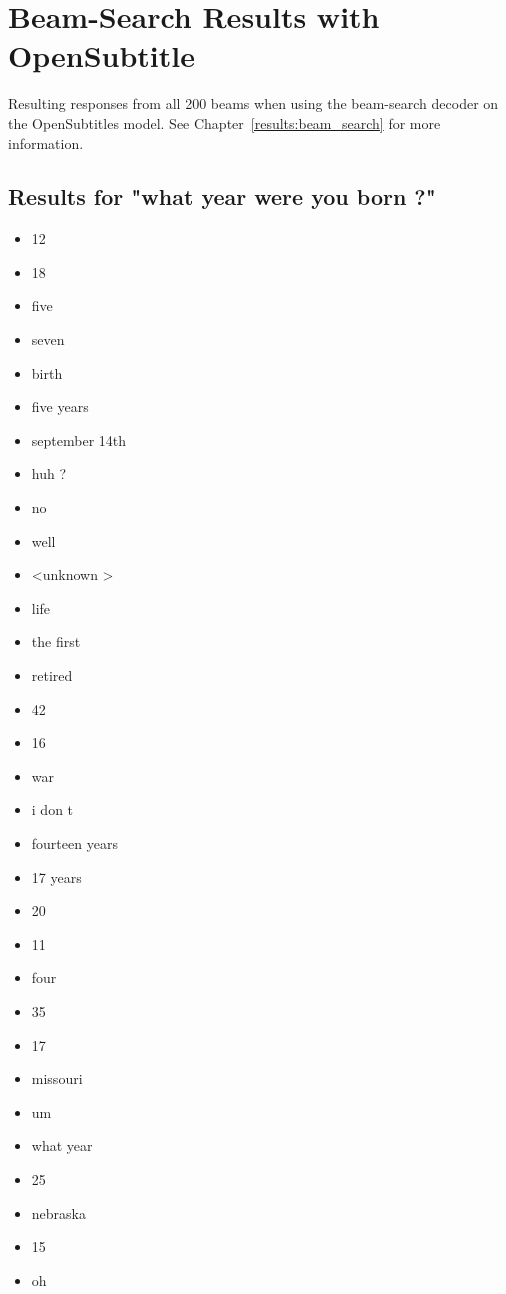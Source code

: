 \chapter{Beam-Search Results with OpenSubtitle}
\label{apendix:results:Beam-search-200:OpenSubtitle}
Resulting responses from all 200 beams when using the beam-search decoder on the OpenSubtitles model. See Chapter~\ref{results:beam_search} for more information.

\section{Results for "what year were you born ?"}
\label{apendix:result1:Beam-search-200:OpenSubtitle}
\begin{multicols}{4}
	\begin{itemize}[noitemsep]
		\item 12
		\item 18
		\item five
		\item seven
		\item birth
		\item five years
		\item september 14th
		\item huh ?
		\item no
		\item well
		\item \textless unknown \textgreater
		\item life
		\item the first
		\item retired
		\item 42
		\item 16
		\item war
		\item i don t
		\item fourteen years
		\item 17 years
		\item 20
		\item 11
		\item four
		\item 35
		\item 17
		\item missouri
		\item um
		\item what year
		\item 25
		\item nebraska
		\item 15
		\item oh

\end{itemize}
\end{multicols}
